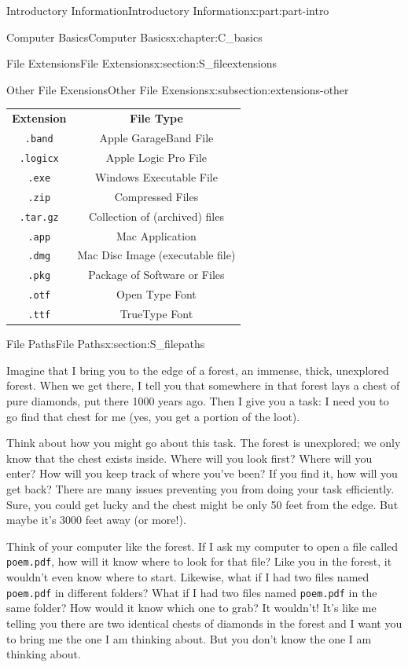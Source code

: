\documentclass[oneside,10pt,]{book}
\newcommand{\tabularfont}{\relax}
\newcommand{\mono}[1]{\texttt{#1}}
\begin{document}
\begin{partptx}{Introductory Information}{}{Introductory Information}{}{}{x:part:part-intro}
\begin{chapterptx}{Computer Basics}{}{Computer Basics}{}{}{x:chapter:C_basics}
\begin{sectionptx}{File Extensions}{}{File Extensions}{}{}{x:section:S_fileextensions}
%
\begin{subsectionptx}{Other File Exensions}{}{Other File Exensions}{}{}{x:subsection:extensions-other}
%
\begin{center}%
{\tabularfont%
\begin{tabular}{cc}
\textbf{Extension}&\textbf{File Type}\tabularnewline[0pt]
\mono{.band}&Apple GarageBand File\tabularnewline[0pt]
\mono{.logicx}&Apple Logic Pro File\tabularnewline[0pt]
\mono{.exe}&Windows Executable File\tabularnewline[0pt]
\mono{.zip}&Compressed Files\tabularnewline[0pt]
\mono{.tar.gz}&Collection of (archived) files\tabularnewline[0pt]
\mono{.app}&Mac Application\tabularnewline[0pt]
\mono{.dmg}&Mac Disc Image (executable file)\tabularnewline[0pt]
\mono{.pkg}&Package of Software or Files\tabularnewline[0pt]
\mono{.otf}&Open Type Font\tabularnewline[0pt]
\mono{.ttf}&TrueType Font
\end{tabular}
}%
\end{center}%
\end{subsectionptx}
\end{sectionptx}
%
%
\typeout{************************************************}
\typeout{************************************************}
%
\begin{sectionptx}{File Paths}{}{File Paths}{}{}{x:section:S_filepaths}
%
%
\begin{introduction}{}%
Imagine that I bring you to the edge of a forest, an immense, thick, unexplored forest. When we get there, I tell you that somewhere in that forest lays a chest of pure diamonds, put there 1000 years ago. Then I give you a task: I need you to go find that chest for me (yes, you get a portion of the loot).%
\par
Think about how you might go about this task. The forest is unexplored; we only know that the chest exists inside. Where will you look first? Where will you enter? How will you keep track of where you've been? If you find it, how will you get back? There are many issues preventing you from doing your task efficiently. Sure, you could get lucky and the chest might be only 50 feet from the edge. But maybe it's 3000 feet away (or more!).%
\par
Think of your computer like the forest. If I ask my computer to open a file called \mono{poem.pdf}, how will it know where to look for that file? Like you in the forest, it wouldn't even know where to start. Likewise, what if I had two files named \mono{poem.pdf} in different folders? What if I had two files named \mono{poem.pdf} in the same folder? How would it know which one to grab? It wouldn't! It's like me telling you there are two identical chests of diamonds in the forest and I want you to bring me the one I am thinking about. But you don't know the one I am thinking about.%

\end{introduction}
\end{sectionptx}
\end{chapterptx}
\end{partptx}
\end{document}
